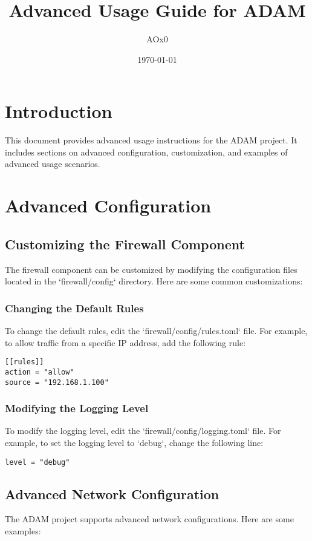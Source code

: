 \documentclass{article}
\title{Advanced Usage Guide for ADAM}
\author{AOx0}
\date{\today}
\begin{document}
\maketitle

\section{Introduction}
This document provides advanced usage instructions for the ADAM project. It includes sections on advanced configuration, customization, and examples of advanced usage scenarios.

\section{Advanced Configuration}
\subsection{Customizing the Firewall Component}
The firewall component can be customized by modifying the configuration files located in the `firewall/config` directory. Here are some common customizations:

\subsubsection{Changing the Default Rules}
To change the default rules, edit the `firewall/config/rules.toml` file. For example, to allow traffic from a specific IP address, add the following rule:
\begin{verbatim}
[[rules]]
action = "allow"
source = "192.168.1.100"
\end{verbatim}

\subsubsection{Modifying the Logging Level}
To modify the logging level, edit the `firewall/config/logging.toml` file. For example, to set the logging level to `debug`, change the following line:
\begin{verbatim}
level = "debug"
\end{verbatim}

\subsection{Advanced Network Configuration}
The ADAM project supports advanced network configurations. Here are some examples:
\end{document}
